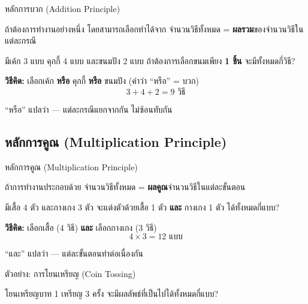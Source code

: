 \documentclass[11pt, aspectratio=169]{beamer}
\begin{document}
\begin{frame}{หลักการบวก (Addition Principle)}
  \begin{explanation}[หลักการบวก]
    ถ้าต้องการทำงานอย่างหนึ่ง โดยสามารถเลือกทำได้จาก 
    จำนวนวิธีทั้งหมด = \textbf{ผลรวม}ของจำนวนวิธีในแต่ละกรณี
  \end{explanation}

  \begin{exambox}
    มีเค้ก 3 แบบ คุกกี้ 4 แบบ และขนมปัง 2 แบบ
    ถ้าต้องการเลือกขนมเพียง \textbf{1 ชิ้น} จะมีทั้งหมดกี่วิธี?

    \medskip
    \textbf{วิธีคิด:} เลือกเค้ก \textbf{หรือ} คุกกี้ \textbf{หรือ} ขนมปัง (คำว่า ``หรือ'' = บวก)
    \[
      3 + 4 + 2 = 9 \text{ วิธี}
    \]
  \end{exambox}

  \begin{intuition}[คิดง่าย ๆ]
    ``หรือ'' แปลว่า  — แต่ละกรณีแยกจากกัน ไม่ซ้อนทับกัน
  \end{intuition}
\end{frame}

\subsection{หลักการคูณ (Multiplication Principle)}

\begin{frame}{หลักการคูณ (Multiplication Principle)}
  \begin{explanation}[หลักการคูณ]
    ถ้าการทำงานประกอบด้วย  จำนวนวิธีทั้งหมด = \textbf{ผลคูณ}จำนวนวิธีในแต่ละขั้นตอน
  \end{explanation}

  \begin{exambox}
    มีเสื้อ 4 ตัว และกางเกง 3 ตัว
    จะแต่งตัวด้วยเสื้อ 1 ตัว \textbf{และ} กางเกง 1 ตัว ได้ทั้งหมดกี่แบบ?

    \medskip
    \textbf{วิธีคิด:} เลือกเสื้อ (4 วิธี) \textbf{และ} เลือกกางเกง (3 วิธี)
    \[
      4 \times 3 = 12 \text{ แบบ}
    \]
  \end{exambox}

  \begin{intuition}[คิดง่าย ๆ]
    ``และ'' แปลว่า  — แต่ละขั้นตอนทำต่อเนื่องกัน
  \end{intuition}
\end{frame}

\begin{frame}[t]{ตัวอย่าง: การโยนเหรียญ (Coin Tossing)}
  \begin{exambox}[โจทย์]
    โยนเหรียญบาท 1 เหรียญ 3 ครั้ง
    จะมีผลลัพธ์ที่เป็นไปได้ทั้งหมดกี่แบบ?
  \end{exambox}

  \vspace{\fill}
\end{frame}
\end{document}
